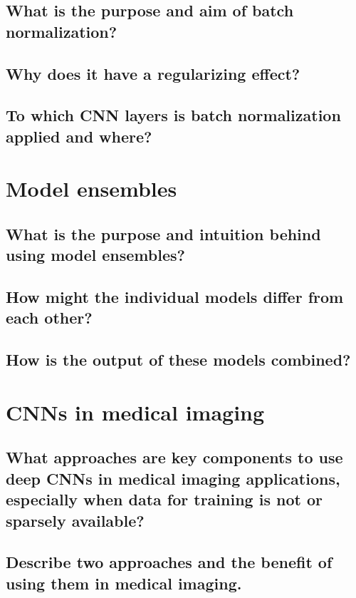 \subsection{What is the purpose and aim of batch normalization?}
\subsection{Why does it have a regularizing effect?}
\subsection{To which CNN layers is batch normalization applied and where?}



\section{Model ensembles}
\subsection{What is the purpose and intuition behind using model ensembles?}
\subsection{How might the individual models differ from each other?}
\subsection{How is the output of these models combined?}

\section{CNNs in medical imaging}
\subsection{What approaches are key components to use deep CNNs in medical imaging applications, especially when data for training is not or sparsely available?}
\subsection{Describe two approaches and the benefit of using them in medical imaging.}

\addtocounter{section}{-1}\section{}\label{sec:todo}